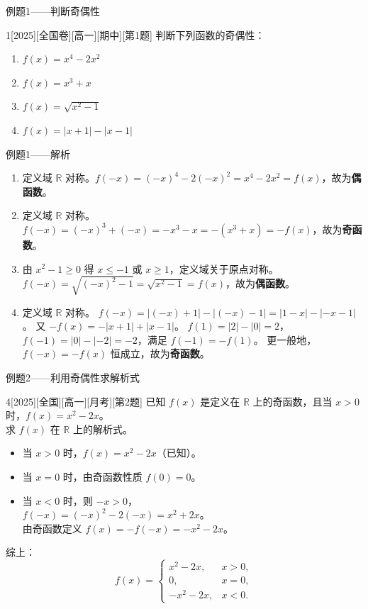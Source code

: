 \begin{frame}{例题1——判断奇偶性}
	\begin{example}{1}[2025][全国卷][高一][期中][第1题]
		判断下列函数的奇偶性：
		\begin{enumerate}
			\item $f(x)=x^4-2x^2$
			\item $f(x)=x^3+x$
			\item $f(x)=\sqrt{x^2-1}$
			\item $f(x)=|x+1|-|x-1|$
		\end{enumerate}
	\end{example}
\end{frame}

\begin{frame}{例题1——解析}
	\begin{solutions}
		\begin{enumerate}
			\item 定义域 $\mathbb{R}$ 对称。$f(-x)=(-x)^4-2(-x)^2=x^4-2x^2=f(x)$，故为\textbf{偶函数}。
			\item 定义域 $\mathbb{R}$ 对称。$f(-x)=(-x)^3+(-x)=-x^3-x=-(x^3+x)=-f(x)$，故为\textbf{奇函数}。
			\item 由 $x^2-1\ge0$ 得 $x\le-1$ 或 $x\ge1$，定义域关于原点对称。
			$f(-x)=\sqrt{(-x)^2-1}=\sqrt{x^2-1}=f(x)$，故为\textbf{偶函数}。
			\item 定义域 $\mathbb{R}$ 对称。
			$f(-x)=|(-x)+1|-|(-x)-1|=|1-x|-|-x-1|$。
			又 $-f(x)=-|x+1|+|x-1|$。
			$f(1)=|2|-|0|=2$，$f(-1)=|0|-|-2|=-2$，满足 $f(-1)=-f(1)$。
			更一般地，$f(-x)=-f(x)$ 恒成立，故为\textbf{奇函数}。
		\end{enumerate}
	\end{solutions}
\end{frame}

\begin{frame}[allowframebreaks]{例题2——利用奇偶性求解析式}
	\begin{example}{4}[2025][全国][高一][月考][第2题]
		已知 $f(x)$ 是定义在 $\mathbb{R}$ 上的奇函数，且当 $x>0$ 时，$f(x)=x^2-2x$。\\
		求 $f(x)$ 在 $\mathbb{R}$ 上的解析式。
	\end{example}
	\begin{solutions}
		\begin{itemize}
			\item 当 $x>0$ 时，$f(x)=x^2-2x$（已知）。
			\item 当 $x=0$ 时，由奇函数性质 $f(0)=0$。
			\item 当 $x<0$ 时，则 $-x>0$，\\
			$f(-x)=(-x)^2-2(-x)=x^2+2x$。\\
			由奇函数定义 $f(x)=-f(-x)=-x^2-2x$。
		\end{itemize}
		综上：
		\[
		f(x)=\begin{cases}
			x^2-2x, & x>0,\\[2pt]
			0, & x=0,\\[2pt]
			-x^2-2x, & x<0.
		\end{cases}
		\]
	\end{solutions}
\end{frame}

